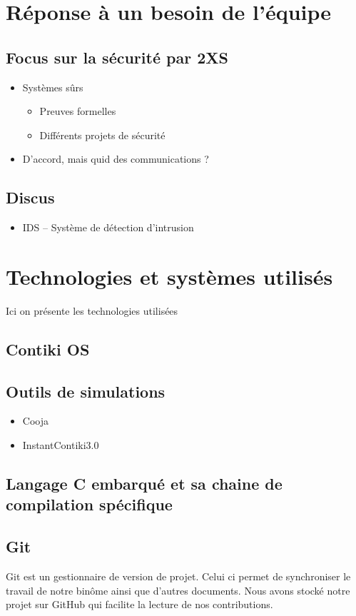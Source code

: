 \section{Réponse à un besoin de l'équipe}
	
	\subsection{Focus sur la sécurité par 2XS}
	\begin{itemize}
		\item Systèmes sûrs
		\begin{itemize}
			\item Preuves formelles
			\item Différents projets de sécurité
		\end{itemize}
		\item D'accord, mais quid des communications ?
	\end{itemize}
	
	\subsection{Discus}
	\begin{itemize}
		\item IDS -- Système de détection d'intrusion
	\end{itemize}

\section{Technologies et systèmes utilisés}
	Ici on présente les technologies utilisées
	\subsection{Contiki OS}
	\subsection{Outils de simulations}
		\begin{itemize}
			\item Cooja
			\item InstantContiki3.0
		\end{itemize}
	\subsection{Langage C embarqué et sa chaine de compilation spécifique}
	\subsection{Git}
	Git est un gestionnaire de version de projet. Celui ci permet de synchroniser le travail de notre binôme ainsi que d'autres documents. Nous avons stocké notre projet sur GitHub qui facilite la lecture de nos contributions.
